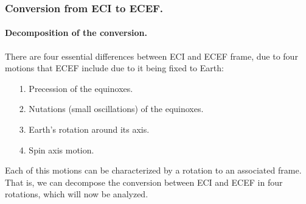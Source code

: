 		\subsubsection{Conversion from ECI to ECEF.}
		\paragraph{Decomposition of the conversion. \\}
		\indent There are four essential differences between ECI and ECEF frame, due to four motions that ECEF include due to it being fixed to Earth:
		\begin{itemize}
		\item[1.] Precession of the equinoxes.
		\item[2.] Nutations (small oscillations) of the equinoxes.
		\item[3.] Earth's rotation around its axis.
		\item[4.] Spin axis motion.
		\end{itemize}
		\indent Each of this motions can be characterized by a rotation to an associated frame. That is, we can decompose the conversion between ECI and ECEF in four rotations, which will now be analyzed.
